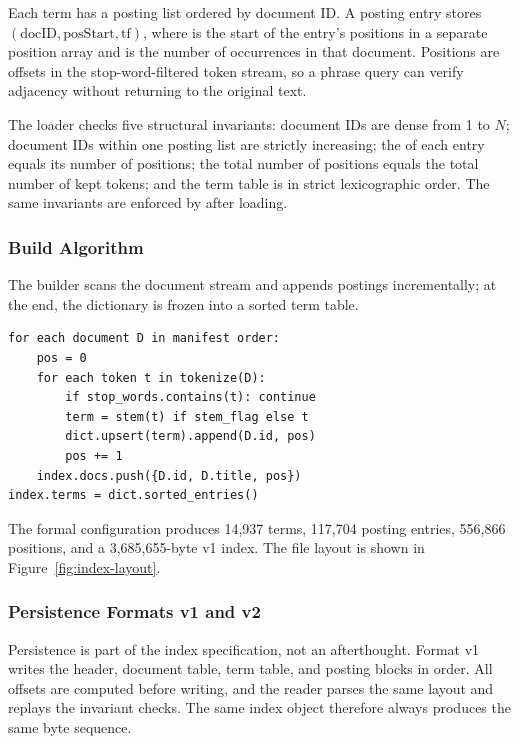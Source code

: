 Each term has a posting list ordered by document ID. A posting entry stores
$(\mathrm{docID},\mathrm{posStart},\mathrm{tf})$, where  is the
start of the entry's positions in a separate position array and  is
the number of occurrences in that document. Positions are offsets in the
stop-word-filtered token stream, so a phrase query can verify adjacency without
returning to the original text.

The loader checks five structural invariants: document IDs are dense from 1 to
$N$; document IDs within one posting list are strictly increasing; the
 of each entry equals its number of positions; the total number of
positions equals the total number of kept tokens; and the term table is in
strict lexicographic order. The same invariants are enforced by
 after loading.

\subsubsection{Build Algorithm}

The builder scans the document stream and appends postings incrementally; at
the end, the dictionary is frozen into a sorted term table.

\begin{lstlisting}[style=cli]
for each document D in manifest order:
    pos = 0
    for each token t in tokenize(D):
        if stop_words.contains(t): continue
        term = stem(t) if stem_flag else t
        dict.upsert(term).append(D.id, pos)
        pos += 1
    index.docs.push({D.id, D.title, pos})
index.terms = dict.sorted_entries()
\end{lstlisting}

The formal configuration produces 14,937 terms, 117,704 posting entries,
556,866 positions, and a 3,685,655-byte v1 index. The file layout is shown in
Figure~\ref{fig:index-layout}.



\subsubsection{Persistence Formats v1 and v2}
\label{sec:persistence}

Persistence is part of the index specification, not an afterthought. Format v1
writes the header, document table, term table, and posting blocks in order. All
offsets are computed before writing, and the reader parses the same layout and
replays the invariant checks. The same index object therefore always produces
the same byte sequence.

